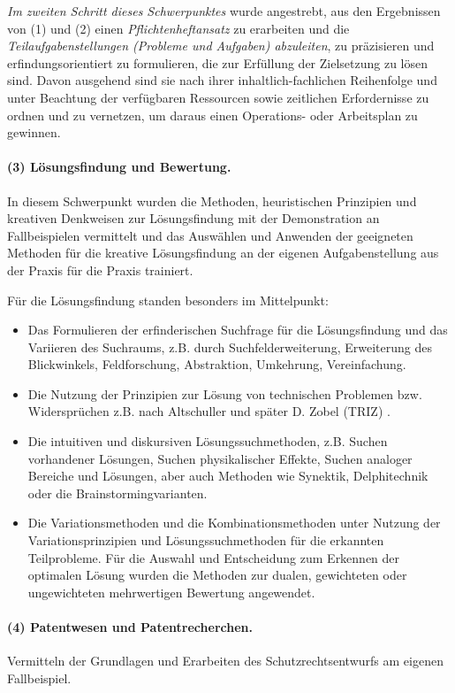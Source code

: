 \documentclass[11pt,a4paper]{article}
\begin{document}
\emph{Im zweiten Schritt dieses Schwerpunktes} wurde angestrebt, aus den
Ergebnissen von (1) und (2) einen \emph{Pflichtenheftansatz} zu erarbeiten und
die \emph{Teilaufgabenstellungen (Probleme und Aufgaben) abzuleiten}, zu
präzisieren und erfindungsorientiert zu formulieren, die zur Erfüllung der
Zielsetzung zu lösen sind. Davon ausgehend sind sie nach ihrer
inhaltlich-fachlichen Reihenfolge und unter Beachtung der verfügbaren
Ressourcen sowie zeitlichen Erfordernisse zu ordnen und zu vernetzen, um
daraus einen Operations- oder Arbeitsplan zu gewinnen.

\paragraph{(3) Lösungsfindung und Bewertung.}
In diesem Schwerpunkt wurden die Methoden, heuristischen Prinzipien und
kreativen Denkweisen zur Lösungsfindung mit der Demonstration an
Fallbeispielen vermittelt und das Auswählen und Anwenden der geeigneten
Methoden für die kreative Lösungsfindung an der eigenen Aufgabenstellung aus
der Praxis für die Praxis trainiert.

Für die Lösungsfindung standen besonders im Mittelpunkt:
\begin{itemize}
\item Das Formulieren der erfinderischen Suchfrage für die Lösungsfindung und
  das Variieren des Suchraums, z.B. durch Suchfelderweiterung, Erweiterung des
  Blickwinkels, Feldforschung, Abstraktion, Umkehrung, Vereinfachung.
\item Die Nutzung der Prinzipien zur Lösung von technischen Problemen bzw.
  Widersprüchen z.B. nach Altschuller und später D. Zobel (TRIZ)
  \cite{9.1,9.3}.
\item Die intuitiven und diskursiven Lösungssuchmethoden, z.B. Suchen
  vorhandener Lösun\-gen, Suchen physikalischer Effekte, Suchen analoger
  Bereiche und Lösungen, aber auch Methoden wie Synektik, Delphitechnik oder
  die Brainstormingvarianten.
\item Die Variationsmethoden und die Kombinationsmethoden unter Nutzung der
  Variationsprinzipien und Lösungssuchmethoden für die erkannten Teilprobleme.
  Für die Auswahl und Entscheidung zum Erkennen der optimalen Lösung wurden
  die Methoden zur dualen, gewichteten oder ungewichteten mehrwertigen
  Bewertung angewendet.
\end{itemize}
 
\paragraph{(4) Patentwesen und Patentrecherchen.} 
Vermitteln der Grundlagen und Erarbeiten des Schutzrechtsentwurfs am eigenen
Fallbeispiel.
\end{document}
